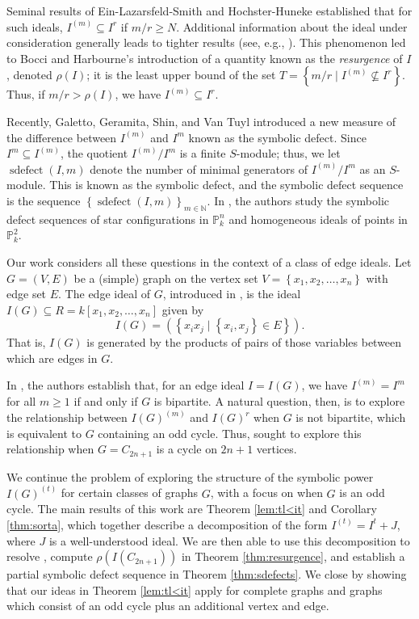 \documentclass[12pt]{amsart}
\def\set#1{\left\{ {#1} \right\}}
\def\setof#1#2{{\left\{#1 \mid #2\right\}}}
\def\sdefect{\operatorname{sdefect}}
\def\P{{\mathbb P}}
\def\N{{\mathbb N}}
\renewcommand{\ge}{\geqslant}
\theoremstyle{plain}
\theoremstyle{definition}
\begin{document}
Seminal results of Ein-Lazarsfeld-Smith and Hochster-Huneke \cite{2001:einlazarsfeldsmith,2002:hochsterhuneke-invent} established that for such ideals, $I^{(m)} \subseteq I^r$ if $m/r \ge N$.
Additional information about the ideal under consideration generally leads to tighter results (see, e.g., \cite{2014:boccicooperharbourne,2013:DenkertJanssen,2013:dumnicki}).
This phenomenon led to Bocci and Harbourne's introduction of a quantity known as the \emph{resurgence} of $I$, denoted $\rho(I)$; it is the least upper bound of the set $T = \setof{m/r}{I^{(m)}\not\subseteq I^r}$.
Thus, if $m/r > \rho(I)$, we have $I^{(m)}\subseteq I^r$.

Recently, Galetto, Geramita, Shin, and Van Tuyl introduced a new measure of the difference between $I^{(m)}$ and $I^m$ known as the symbolic defect.
Since $I^m\subseteq I^{(m)}$, the quotient $I^{(m)}/I^m$ is a finite $S$-module; thus, we let $\sdefect(I,m)$ denote the number of minimal generators of $I^{(m)}/I^m$ as an $S$-module.
This is known as the symbolic defect, and the symbolic defect sequence is the sequence $\set{\sdefect(I,m)}_{m\in\N}$.
In \cite{2016:galettogeramitavantuyl}, the authors study the symbolic defect sequences of star configurations in $\P^n_k$ and homogeneous ideals of points in $\P^2_k$.

Our work considers all these questions in the context of a class of edge ideals.
Let $G = (V,E)$ be a (simple) graph on the vertex set $V = \set{x_1,x_2,\ldots,x_n}$ with edge set $E$.
The edge ideal of $G$, introduced in \cite{Villarreal1990}, is the ideal $I(G)\subseteq R = k[x_1,x_2,\ldots,x_n]$ given by
\[
	I(G) = (\setof{x_i x_j}{\set{x_i, x_j}\in E}).
\]
That is, $I(G)$ is generated by the products of pairs of those variables between which are edges in $G$.

In \cite{1994:simisvasconcelosvillareal}, the authors establish that, for an edge ideal $I = I(G)$, we have $I^{(m)} = I^m$ for all $m \ge 1$ if and only if $G$ is bipartite.
A natural question, then, is to explore the relationship between $I(G)^{(m)}$ and $I(G)^r$ when $G$ is not bipartite, which is equivalent to $G$ containing an odd cycle.
Thus, \cite{2004:worthenelliswilson} sought to explore this relationship when $G = C_{2n+1}$ is a cycle on $2n+1$ vertices.



We continue the problem of exploring the structure of the symbolic power $I(G)^{(t)}$ for certain classes of graphs $G$, with a focus on when $G$ is an odd cycle.
The main results of this work are Theorem \ref{lem:tl<it} and Corollary \ref{thm:sorta}, which together describe a decomposition of the form $I^{(t)} = I^t + J$, where $J$ is a well-understood ideal. 
We are then able to use this decomposition to resolve  \cite[Conjecture 15]{2004:worthenelliswilson}, compute $\rho(I(C_{2n+1}))$ in Theorem \ref{thm:resurgence}, and establish a partial symbolic defect sequence in Theorem \ref{thm:sdefects}.
We close by showing that our ideas in Theorem \ref{lem:tl<it} apply for complete graphs and graphs which consist of an odd cycle plus an additional vertex and edge.
\end{document}
